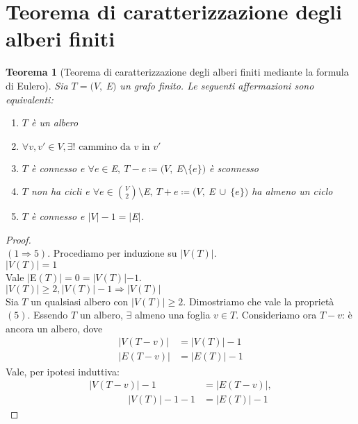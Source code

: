 \documentclass[12pt,twoscolu]{article}
\newcommand{\implica}{\Longrightarrow}
\renewcommand\qedsymbol{$\blacksquare$}
\newcommand{\Eps}{$E\:$}
\newcommand{\MathEps}{E}
\newcommand{\grafo}{(V, \: \Eps)}
\newcommand{\baseinduzalbero}[1]{\\[1\baselineskip]{\boldmath$ |V(T)| = #1$}}
\newcommand{\induzalbero}[1]{\\[1\baselineskip]{\boldmath$|V(T)| \ge #1, |V(T)| -1 \implica |V(T)|$}}
\newtheorem{theorem}{Teorema}
\begin{document}
\section{Teorema di caratterizzazione degli alberi finiti}
\begin{theorem}[Teorema di caratterizzazione degli alberi finiti mediante la formula di Eulero]
Sia $T = \grafo$ un grafo finito. Le seguenti affermazioni sono equivalenti:
\begin{enumerate}
\item $T$ è un albero
\item $\forall v, v' \in V, \exists! \text{ cammino da } v \text{ in } v'$
\item $T$ è connesso e $\forall e \in \Eps,\ T-e \coloneqq (V,\ \Eps \setminus \{e\})$ è sconnesso
\item $T$ non ha cicli e $\forall e \in \binom{V}{2} \setminus \Eps, \ T + e \coloneqq (V, \ \Eps \ \cup \ \{e\})$ ha almeno un ciclo
\item $T$ è connesso e $|V| - 1 = |\Eps|$.
\end{enumerate}
\end{theorem}

\renewcommand\qedsymbol{$\square$}
\begin{proof}\ \\
$(1 \implica 5).$ Procediamo per induzione su $|V(T)|$.
\baseinduzalbero{1}
\\Vale $|\Eps(T)| = 0 = |V(T)| - 1$.
\induzalbero{2}\nopagebreak
\\Sia $T$ un qualsiasi albero con $|V(T)| \ge 2$. Dimostriamo che vale la proprietà $(5)$. Essendo $T$ un albero, $\exists$ almeno una foglia $v \in T$. Consideriamo ora $T - v$: è ancora un albero, dove
\begin{align*}
|V(T-v)| &= |V(T)| - 1 \\
| \MathEps (T-v) | &= |\MathEps (T) | -1 
\end{align*}
Vale, per ipotesi induttiva:
\begin{align*}
|V(T-v) | -1 &= |\MathEps(T-v)|,
\\ \qquad\qquad |V(T)| -1 -1 &= |\MathEps(T) | -1
\end{align*}
\end{proof}
\end{document}

